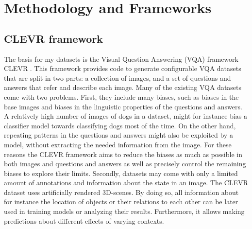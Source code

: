 \section{Methodology and Frameworks}
\label{sec:methodology}

\subsection{CLEVR framework}
The basis for my datasets is the Visual Question Answering (VQA) framework CLEVR \citep{Johnson2017a}.
This framework provides code to generate configurable VQA datasets that are split in two parts: a collection of images, and a set of questions and answers that refer and describe each image.
Many of the existing VQA datasets come with two problems.
First, they include many biases, such as biases in the base images and biases in the linguistic properties of the questions and answers.
A relatively high number of images of dogs in a dataset, might for instance bias a classifier model towards classifying dogs most of the time.
On the other hand, repeating patterns in the questions and answers might also be exploited by a model, without extracting the needed information from the image.
For these reasons the CLEVR framework aims to reduce the biases as much as possible in both images and questions and answers as well as precisely control the remaining biases to explore their limits.
Secondly, datasets may come with only a limited amount of annotations and information about the state in an image.
The CLEVR dataset uses artificially rendered 3D-scenes.
By doing so, all information about for instance the location of objects or their relations to each other can be later used in training models or analyzing their results.
Furthermore, it allows making predictions about different effects of varying contexts.

